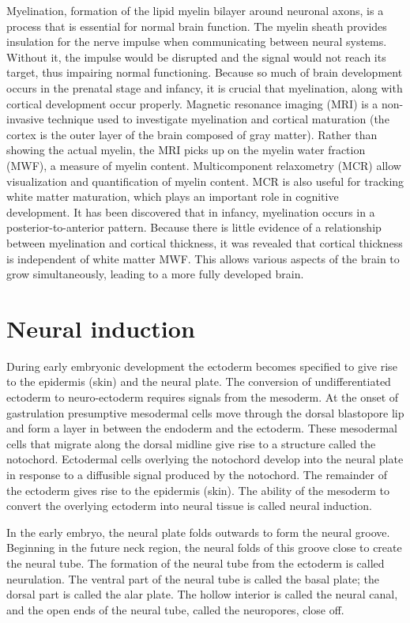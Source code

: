 \documentclass[]{book}
\begin{document}
Myelination, formation of the lipid myelin bilayer around neuronal axons, is a process that is essential for normal brain function. The myelin sheath provides insulation for the nerve impulse when communicating between neural systems. Without it, the impulse would be disrupted and the signal would not reach its target, thus impairing normal functioning. Because so much of brain development occurs in the prenatal stage and infancy, it is crucial that myelination, along with cortical development occur properly. Magnetic resonance imaging (MRI) is a non-invasive technique used to investigate myelination and cortical maturation (the cortex is the outer layer of the brain composed of gray matter). Rather than showing the actual myelin, the MRI picks up on the myelin water fraction (MWF), a measure of myelin content. Multicomponent relaxometry (MCR) allow visualization and quantification of myelin content. MCR is also useful for tracking white matter maturation, which plays an important role in cognitive development. It has been discovered that in infancy, myelination occurs in a posterior-to-anterior pattern. Because there is little evidence of a relationship between myelination and cortical thickness, it was revealed that cortical thickness is independent of white matter MWF. This allows various aspects of the brain to grow simultaneously, leading to a more fully developed brain.

\hypertarget{neural-induction}{%
\section{Neural induction}\label{neural-induction}}

During early embryonic development the ectoderm becomes specified to give rise to the epidermis (skin) and the neural plate. The conversion of undifferentiated ectoderm to neuro-ectoderm requires signals from the mesoderm. At the onset of gastrulation presumptive mesodermal cells move through the dorsal blastopore lip and form a layer in between the endoderm and the ectoderm. These mesodermal cells that migrate along the dorsal midline give rise to a structure called the notochord. Ectodermal cells overlying the notochord develop into the neural plate in response to a diffusible signal produced by the notochord. The remainder of the ectoderm gives rise to the epidermis (skin). The ability of the mesoderm to convert the overlying ectoderm into neural tissue is called neural induction.

In the early embryo, the neural plate folds outwards to form the neural groove. Beginning in the future neck region, the neural folds of this groove close to create the neural tube. The formation of the neural tube from the ectoderm is called neurulation. The ventral part of the neural tube is called the basal plate; the dorsal part is called the alar plate. The hollow interior is called the neural canal, and the open ends of the neural tube, called the neuropores, close off.
\end{document}
